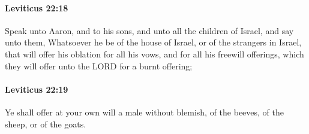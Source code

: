 		\paragraph{Leviticus 22:18} %
			\label{LEVITICUS-22-18}

			Speak unto Aaron, and to his sons, and unto all the children of Israel, and say unto them, Whatsoever he be of the house of Israel, or of the strangers in Israel, that will offer his oblation for all his vows, and for all his freewill offerings, which they will offer unto the LORD for a burnt offering;


		\paragraph{Leviticus 22:19} %
			\label{LEVITICUS-22-19}

			Ye shall offer at your own will a male without blemish, of the beeves, of the sheep, or of the goats.

